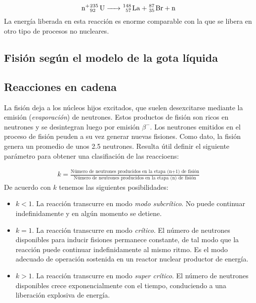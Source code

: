 \begin{equation}
\ce{n+^235_92 U -> ^148_57 La + ^87_35 Br + n}
\end{equation}
La energía liberada en esta reacción es enorme comparable con la que se libera en otro tipo de procesos no nucleares. 

\subsection{Fisión según el modelo de la gota líquida}

\subsection{Reacciones en cadena}

La fisión deja a los núcleos hijos excitados, que suelen desexcitarse mediante la emisión (\textit{evaporación}) de neutrones. Estos productos de fisión son ricos en neutrones y se desintegran luego por emisión $\beta^-$. Los neutrones emitidos en el proceso de fisión peuden a su vez generar nuevas fisiones. Como dato, la fisión  genera un promedio de unos 2.5 neutrones. Resulta útil definir el siguiente parámetro para obtener una clasifiación de las reaccioens:

\begin{eqnarray}    
    k = \frac{\text{Número de neutrones producidos en la etapa (n+1) de fisión}}{\text{Número de neutrones producidos en la etapa (n) de fisión}}
\end{eqnarray}
De acuerdo con $k$ tenemos las siguientes posibilidades:

\begin{itemize}
    \item $k<1$. La reacción transcurre en modo \textit{modo subcrítico}. No puede continuar indefinidamente y en algún momento se detiene.
    \item $k=1$. La reacción transcurre en modo \textit{crítico}. El número de neutrones disponibles para inducir fisiones permanece constante, de tal modo que la reacción puede continuar indefinidamente al mismo ritmo. Es el modo adecuado de operación sostenida en un reactor nuclear productor de energía.
    \item $k>1$. La reacción transcurre en modo \textit{super crítico}. El número de neutrones disponibles crece exponencialmente con el tiempo, conduciendo a una liberación explosiva de energía.
\end{itemize}

